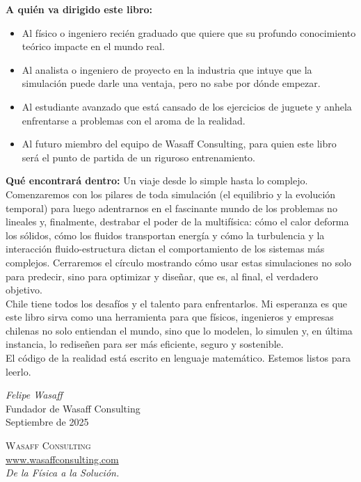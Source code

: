 \textbf{A quién va dirigido este libro:}
\begin{itemize}
    \item Al físico o ingeniero recién graduado que quiere que su profundo conocimiento teórico impacte en el mundo real.
    \item Al analista o ingeniero de proyecto en la industria que intuye que la simulación puede darle una ventaja, pero no sabe por dónde empezar.
    \item Al estudiante avanzado que está cansado de los ejercicios de juguete y anhela enfrentarse a problemas con el aroma de la realidad.
    \item Al futuro miembro del equipo de Wasaff Consulting, para quien este libro será el punto de partida de un riguroso entrenamiento.
\end{itemize}

\textbf{Qué encontrará dentro:}
Un viaje desde lo simple hasta lo complejo. Comenzaremos con los pilares de toda simulación (el equilibrio y la evolución temporal) para luego adentrarnos en el fascinante mundo de los problemas no lineales y, finalmente, destrabar el poder de la multifísica: cómo el calor deforma los sólidos, cómo los fluidos transportan energía y cómo la turbulencia y la interacción fluido-estructura dictan el comportamiento de los sistemas más complejos. Cerraremos el círculo mostrando cómo usar estas simulaciones no solo para predecir, sino para optimizar y diseñar, que es, al final, el verdadero objetivo.\\

Chile tiene todos los desafíos y el talento para enfrentarlos. Mi esperanza es que este libro sirva como una herramienta para que físicos, ingenieros y empresas chilenas no solo entiendan el mundo, sino que lo modelen, lo simulen y, en última instancia, lo rediseñen para ser más eficiente, seguro y sostenible.\\

El código de la realidad está escrito en lenguaje matemático. Estemos listos para leerlo.

\vspace{2cm} %

\begin{flushright}
    \textit{Felipe Wasaff} \\
    Fundador de Wasaff Consulting \\
    Septiembre de 2025
\end{flushright}

\vspace{2cm}

\begin{center}
    \textsc{Wasaff Consulting} \\
    \url{www.wasaffconsulting.com} \\
    \textit{De la Física a la Solución.}
\end{center}
